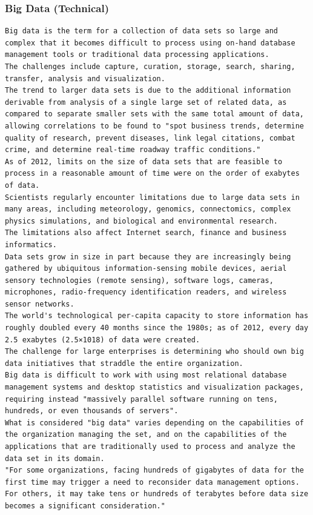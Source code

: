 \documentclass[BTech]{nitgoathesis}
\begin{document}
\subsubsection{Big Data (Technical)}
\begin{lstlisting}[basicstyle=\scriptsize]
Big data is the term for a collection of data sets so large and complex that it becomes difficult to process using on-hand database management tools or traditional data processing applications.
The challenges include capture, curation, storage, search, sharing, transfer, analysis and visualization.
The trend to larger data sets is due to the additional information derivable from analysis of a single large set of related data, as compared to separate smaller sets with the same total amount of data, allowing correlations to be found to "spot business trends, determine quality of research, prevent diseases, link legal citations, combat crime, and determine real-time roadway traffic conditions."
As of 2012, limits on the size of data sets that are feasible to process in a reasonable amount of time were on the order of exabytes of data.
Scientists regularly encounter limitations due to large data sets in many areas, including meteorology, genomics, connectomics, complex physics simulations, and biological and environmental research. 
The limitations also affect Internet search, finance and business informatics.
Data sets grow in size in part because they are increasingly being gathered by ubiquitous information-sensing mobile devices, aerial sensory technologies (remote sensing), software logs, cameras, microphones, radio-frequency identification readers, and wireless sensor networks.
The world's technological per-capita capacity to store information has roughly doubled every 40 months since the 1980s; as of 2012, every day 2.5 exabytes (2.5×1018) of data were created.
The challenge for large enterprises is determining who should own big data initiatives that straddle the entire organization.
Big data is difficult to work with using most relational database management systems and desktop statistics and visualization packages, requiring instead "massively parallel software running on tens, hundreds, or even thousands of servers".
What is considered "big data" varies depending on the capabilities of the organization managing the set, and on the capabilities of the applications that are traditionally used to process and analyze the data set in its domain.
"For some organizations, facing hundreds of gigabytes of data for the first time may trigger a need to reconsider data management options.
For others, it may take tens or hundreds of terabytes before data size becomes a significant consideration."
\end{lstlisting}
\pagebreak
\end{document}

